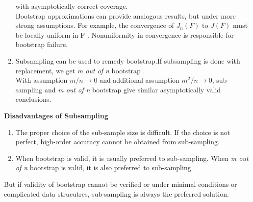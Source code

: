 \documentclass[a4paper, 11pt]{article}
\begin{document}
\begin{enumerate}
 with asymptotically correct coverage.\\
 Bootstrap approximations can provide analogous results, but under more strong assumptions. For example, the convergence of $J_n(F)$ to $J(F)$ must be locally uniform in F . Nonuniformity in convergence is responsible for bootstrap failure.\\
 \item Subsampling can be used to remedy bootstrap.If subsampling is done with replacement, we get \textit{m out of n} bootstrap .\\ With assumption $m/n \rightarrow 0$ and additional assumption $m^2/n \rightarrow 0$, sub-sampling and \textit{m out of n} bootstrap give similar asymptotically valid conclusions.\\
 
\end{enumerate}
\textbf{Disadvantages of Subsampling} 
  \begin{enumerate}
\item The proper choice of the sub-sample size is difficult. If the choice is not perfect, high-order accuracy cannot be obtained from sub-sampling.\\
\item When bootstrap is valid, it is usually preferred to sub-sampling. When \textit{m out of n} bootstrap is valid, it is also preferred to sub-sampling. \\
\end{enumerate}
But if validity of bootstrap cannot be verified or under minimal conditions or complicated data strucutres, sub-sampling is always the preferred solution.\\
\end{document}
